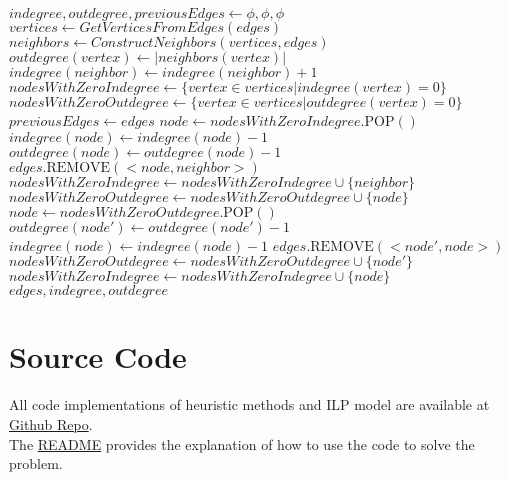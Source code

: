 \documentclass{article}
\begin{document}
\newpage

\begin{algorithm}
\begin{algorithmic}

\State $indegree, outdegree, previousEdges \gets \phi, \phi, \phi$
\State $vertices \gets GetVerticesFromEdges(edges)$
\State $neighbors \gets ConstructNeighbors(vertices, edges)$
    \State $outdegree(vertex) \gets \lvert neighbors(vertex) \rvert$
        \State $indegree(neighbor) \gets indegree(neighbor) + 1$
    \EndFor
\EndFor
\State $nodesWithZeroIndegree \gets \{vertex \in vertices| indegree(vertex) = 0\}$
\State $nodesWithZeroOutdegree \gets \{vertex \in vertices| outdegree(vertex) = 0\}$
\State $previousEdges \gets edges$
    \State $node \gets nodesWithZeroIndegree.\textrm{POP}()$
        \State $indegree(node) \gets indegree(node) - 1$
        \State $outdegree(node) \gets outdegree(node) - 1$
             \State $edges.\textrm{REMOVE}(<node, neighbor>)$
        \EndIf
            \State $nodesWithZeroIndegree \gets nodesWithZeroIndegree \cup \{neighbor\}$
        \EndIf
            \State $nodesWithZeroOutdegree \gets nodesWithZeroOutdegree \cup \{node\}$
        \EndIf
    \EndFor
\EndWhile
{}
    \State $node \gets nodesWithZeroOutdegree.\textrm{POP}()$
    \State $outdegree(node') \gets outdegree(node') - 1$
    \State $indegree(node) \gets indegree(node) - 1$
        \State $edges.\textrm{REMOVE}(<node', node>)$
    \EndIf
        \State $nodesWithZeroOutdegree \gets nodesWithZeroOutdegree \cup \{node'\}$
    \EndIf
        \State $nodesWithZeroIndegree \gets nodesWithZeroIndegree \cup \{node\}$
    \EndIf
    \EndIf
    \EndFor
\EndWhile
\EndWhile
\State \Return $edges, indegree, outdegree$
\EndFunction

\end{algorithmic}
\end{algorithm}

\section{Source Code}

All code implementations of heuristic methods and ILP model are available at \href{https://github.com/tmactong/AMMM-project}{Github Repo}.\\
The \href{https://github.com/tmactong/AMMM-project/blob/main/README.md}{README} provides the explanation of how to use the code to solve the problem.
 
\end{document}
